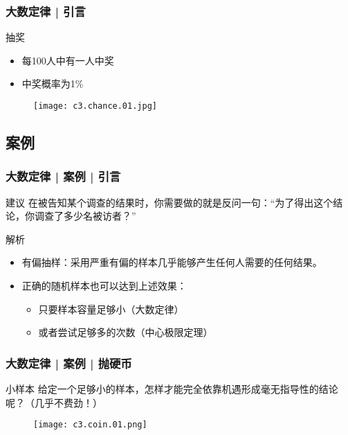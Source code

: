 \begin{frame}
  \frametitle{大数定律 | 引言}
  \begin{block}{抽奖}
    \begin{itemize}
      \item 每100人中有一人中奖
      \item 中奖概率为1\%
    \end{itemize}
    \vspace{-1em}
    \begin{figure}
      \centering
      \texttt{[image: c3.chance.01.jpg]}
    \end{figure}
  \end{block}
\end{frame}

\subsection{案例}
\begin{frame}
  \frametitle{大数定律 | 案例 | 引言}
  \begin{block}{建议}
    在被告知某个调查的结果时，你需要做的就是反问一句：“为了得出这个结论，你调查了多少名被访者？”
  \end{block}
  \pause
  \begin{block}{解析}
    \begin{itemize}
      \item 有偏抽样：采用严重有偏的样本几乎能够产生任何人需要的任何结果。
      \item 正确的随机样本也可以达到上述效果：
        \begin{itemize}
          \item 只要样本容量足够小（大数定律）
          \item 或者尝试足够多的次数（中心极限定理）
        \end{itemize}
    \end{itemize}
  \end{block}
\end{frame}

\begin{frame}
  \frametitle{大数定律 | 案例 | 抛硬币}
  \begin{block}{小样本}
    给定一个足够小的样本，怎样才能完全依靠机遇形成毫无指导性的结论呢？（几乎不费劲！）
  \end{block}
  \begin{figure}
    \centering
    \texttt{[image: c3.coin.01.png]}
  \end{figure}
\end{frame}

